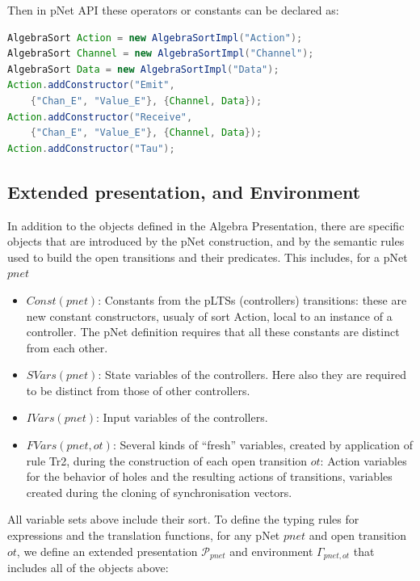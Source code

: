 \documentclass{lncs/llncs}
\begin{document}
Then in pNet API these operators or constants can be declared as:
\begin{lstlisting}[basicstyle=\scriptsize\ttfamily, language=java, frame=single]
AlgebraSort Action = new AlgebraSortImpl("Action");
AlgebraSort Channel = new AlgebraSortImpl("Channel");
AlgebraSort Data = new AlgebraSortImpl("Data");
Action.addConstructor("Emit", 
	{"Chan_E", "Value_E"}, {Channel, Data});
Action.addConstructor("Receive", 
	{"Chan_E", "Value_E"}, {Channel, Data});
Action.addConstructor("Tau");
\end{lstlisting}

\subsection{Extended presentation, and Environment}

In addition to the objects defined in the Algebra Presentation, there are
specific objects that are introduced by the pNet construction, and by
the semantic rules used to build the open transitions and their
predicates. This includes, for a pNet $pnet$
\begin{itemize}
\item $Const(pnet)$: Constants from the pLTSs (controllers) transitions: these are
  new constant constructors, usualy of sort Action, local to an
  instance of a controller. The pNet definition requires that all
  these constants are distinct from each other.
\item $SVars(pnet)$: State variables of the controllers. Here also they are required
  to be distinct from those of other controllers.
\item $IVars(pnet)$: Input variables of the controllers.
\item $FVars(pnet,ot)$: Several kinds of ``fresh'' variables, created by application of
  rule Tr2, during the construction of each open transition $ot$:
  Action variables for the behavior of holes and the 
  resulting actions of transitions, variables created during the cloning
  of synchronisation vectors.
\end{itemize}

\def\EPres{\mathcal{P}}
\def\EEnv{\Gamma}

All variable sets above include their sort.
To define the typing rules for expressions and the translation
functions, for any pNet $pnet$ and open transition $ot$, we define an
extended presentation $\EPres_{pnet}$ and environment $\EEnv_{pnet,ot}$ that includes all of the
objects above:
\end{document}
